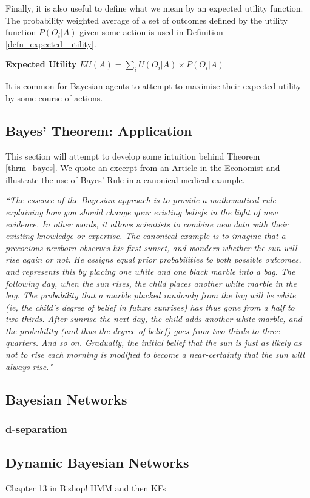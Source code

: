 \documentclass[../masters.tex]{subfiles}
\begin{document}
Finally, it is also useful to define what we mean by an expected utility function. The probability weighted average of a set of outcomes defined by the utility function $P(O_i|A)$ given some action is used in Definition \ref{defn_expected_utility}.
\begin{defn}
\textbf{Expected Utility} $EU(A) = \sum_i U(O_i|A) \times P(O_i|A)$
\label{defn_expected_utility}
\end{defn}
It is common for Bayesian agents to attempt to maximise their expected utility by some course of actions.

\subsection{Bayes' Theorem: Application}
This section will attempt to develop some intuition behind Theorem \ref{thrm_bayes}. We quote an excerpt from an Article in the Economist \cite{eco1} and illustrate the use of Bayes' Rule in a canonical medical example.

\textit{``The essence of the Bayesian approach is to provide a mathematical rule explaining how you should change your existing beliefs in the light of new evidence. In other words, it allows scientists to combine new data with their existing knowledge or expertise. The canonical example is to imagine that a precocious newborn observes his first sunset, and wonders whether the sun will rise again or not. He assigns equal prior probabilities to both possible outcomes, and represents this by placing one white and one black marble into a bag. The following day, when the sun rises, the child places another white marble in the bag. The probability that a marble plucked randomly from the bag will be white (ie, the child's degree of belief in future sunrises) has thus gone from a half to two-thirds. After sunrise the next day, the child adds another white marble, and the probability (and thus the degree of belief) goes from two-thirds to three-quarters. And so on. Gradually, the initial belief that the sun is just as likely as not to rise each morning is modified to become a near-certainty that the sun will always rise."}


\subsection{Bayesian Networks}

\subsubsection{d-separation}


\subsection{Dynamic Bayesian Networks}
Chapter 13 in Bishop! HMM and then KFs
\end{document}

